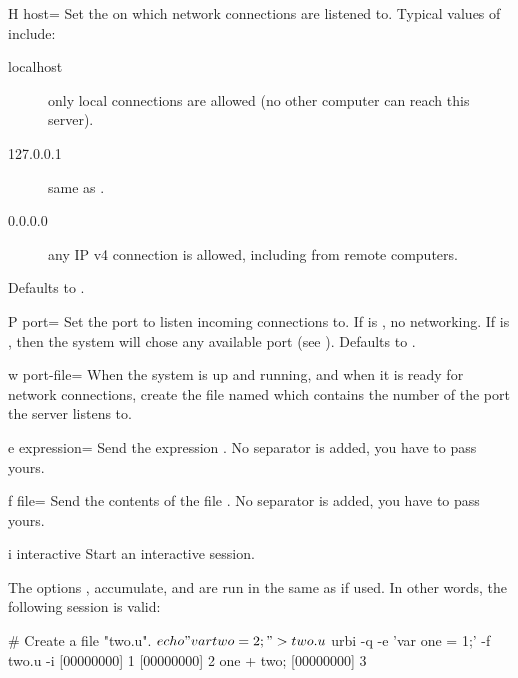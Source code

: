 \begin{options}[Networking]
\item[H]{host=} Set the  on which network
  connections are listened to.  Typical values of 
  include:
  \begin{sublist}
    \begin{description}
    \item[localhost] only local connections are allowed (no other
      computer can reach this server).
    \item[127.0.0.1] same as .
    \item[0.0.0.0] any IP v4 connection is allowed, including from
      remote computers.
  \end{description}
  \end{sublist}
  Defaults to .
\item[P]{port=} Set the port to listen incoming
  connections to.  If  is , no networking.  If
   is , then the system will chose any available
  port (see ).  Defaults to .
\item[w]{port-file=} When the system is up and running,
  and when it is ready for network connections, create the file named
   which contains the number of the port the server listens
  to.
\end{options}


\begin{options}[Execution]
\item[e]{expression=} Send the \us expression .
  No separator is added, you have to pass yours.
\item[f]{file=} Send the contents of the file .
  No separator is added, you have to pass yours.
\item[i]{interactive} Start an interactive session.
\end{options}

The options ,  accumulate, and are run in the
same  as  if used.  In other words, the
following session is valid:

\begin{shell}[alsolanguage={[interactive]urbiscript}]
# Create a file "two.u".
$ echo "var two = 2;" >two.u
$ urbi -q -e 'var one = 1;' -f two.u -i
[00000000] 1
[00000000] 2
one + two;
[00000000] 3
\end{shell}%


